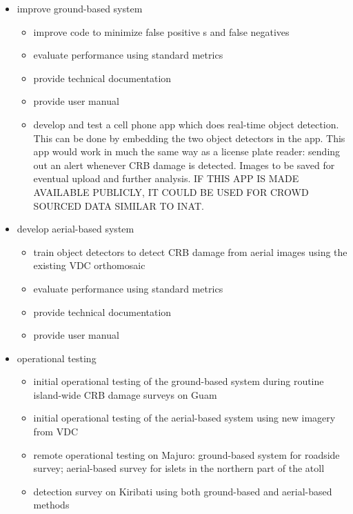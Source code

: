 \documentclass[11pt,english,letterpaper]{scrartcl}
\begin{document}
\begin{itemize}
	
	\item improve ground-based system
	\begin{itemize}
		\item improve code to minimize false positive s and false negatives
		\item evaluate performance using standard metrics
		\item provide technical documentation
		\item provide user manual
		\item develop and test a cell phone app which does real-time object detection. This can be done by embedding the two object detectors in the app. This app would work in much the same way as a license plate reader: sending out an alert whenever CRB damage is detected. Images to be saved for eventual upload and further analysis. IF THIS APP IS MADE AVAILABLE PUBLICLY, IT COULD BE USED FOR CROWD SOURCED DATA SIMILAR TO INAT.
	\end{itemize}
	
	\item develop aerial-based system
	\begin{itemize}
		\item train object detectors to detect CRB damage from aerial images using the existing VDC orthomosaic
		\item evaluate performance using standard metrics
		\item provide technical documentation
		\item provide user manual
	\end{itemize}
	
	\item operational testing
	\begin{itemize}
		\item initial operational testing of the ground-based system during routine island-wide CRB damage surveys on Guam
		\item initial operational testing of the aerial-based system using new imagery from VDC
		\item remote operational testing on Majuro: ground-based system for roadside survey; aerial-based survey for islets in the northern part of the atoll
		\item detection survey on Kiribati using both ground-based and aerial-based methods		
	\end{itemize}
	
\end{itemize}
\end{document}
